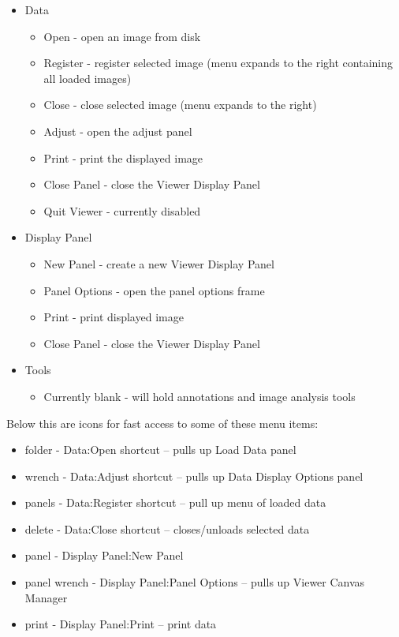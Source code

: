 \begin{itemize}
\item  Data
  \begin{itemize}
      \item  Open - open an image from disk
      \item  Register - register selected image (menu expands to the
             right containing all loaded images) 
      \item  Close - close selected image (menu expands to the right)
      \item  Adjust - open the adjust panel 
      \item  Print - print the displayed image
      \item  Close Panel - close the Viewer Display Panel
      \item  Quit Viewer - currently disabled
  \end{itemize}
\item Display Panel
  \begin{itemize}
      \item New Panel - create a new Viewer Display Panel
      \item Panel Options - open the panel options frame
      \item Print - print displayed image
      \item Close Panel - close the Viewer Display Panel
  \end{itemize}
\item Tools
  \begin{itemize}
      \item Currently blank - will hold annotations and image analysis tools
  \end{itemize}
\end{itemize}

Below this are icons for fast access to some of these menu items:

\begin{itemize}
   \item folder - Data:Open shortcut -- pulls up Load Data panel
   \item wrench - Data:Adjust shortcut -- pulls up Data Display Options panel
   \item panels - Data:Register shortcut -- pull up menu of loaded data
   \item delete - Data:Close shortcut -- closes/unloads selected data
   \item panel  - Display Panel:New Panel
   \item panel wrench - Display Panel:Panel Options -- pulls up Viewer Canvas Manager
   \item print  - Display Panel:Print -- print data
\end{itemize}

